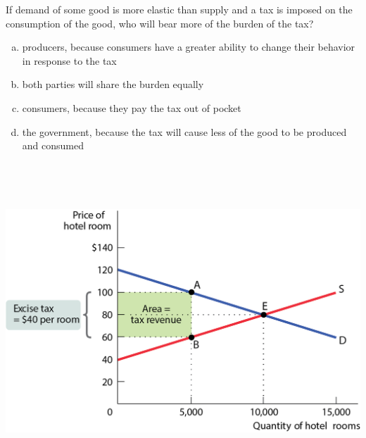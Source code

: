 \documentclass[
  ignorenonframetext,
]{beamer}
\providecommand{\tightlist}{%
  \setlength{\itemsep}{0pt}\setlength{\parskip}{0pt}}
\begin{document}
\begin{frame}{}
\protect\hypertarget{section-12}{}
If demand of some good is more elastic than supply and a tax is imposed
on the consumption of the good, who will bear more of the burden of the
tax?

\begin{enumerate}
[a)]
\tightlist
\item
  producers, because consumers have a greater ability to change their
  behavior in response to the tax
\item
  both parties will share the burden equally
\item
  consumers, because they pay the tax out of pocket
\item
  the government, because the tax will cause less of the good to be
  produced and consumed
\end{enumerate}
\end{frame}

\begin{frame}{}
\protect\hypertarget{section-13}{}
\includegraphics[width=\textwidth,height=4.6875in]{figures/fig14_6.png}
\end{frame}
\end{document}
